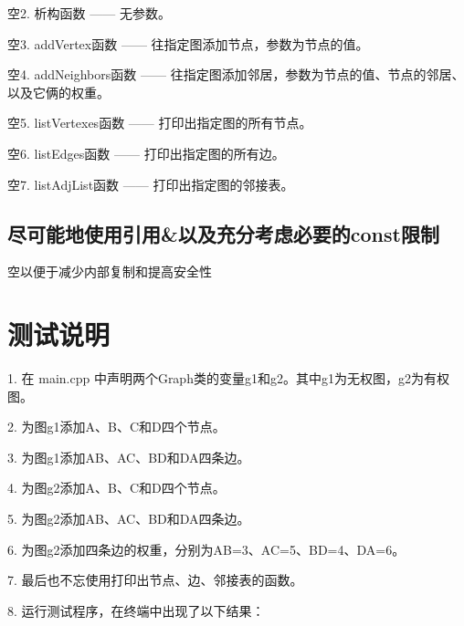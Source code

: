 \documentclass[UTF8]{ctexart}
\begin{document}
\hphantom 空2. 析构函数 —— 无参数。\newline

\hphantom 空3. addVertex函数 —— 往指定图添加节点，参数为节点的值。\newline

\hphantom 空4. addNeighbors函数 —— 往指定图添加邻居，参数为节点的值、节点的邻居、以及它俩的权重。\newline

\hphantom 空5. listVertexes函数 —— 打印出指定图的所有节点。\newline

\hphantom 空6. listEdges函数 —— 打印出指定图的所有边。\newline

\hphantom 空7. listAdjList函数 —— 打印出指定图的邻接表。

\subsection{尽可能地使用引用\&以及充分考虑必要的const限制}
\hphantom 空以便于减少内部复制和提高安全性

\section{测试说明}

1. 在 main.cpp 中声明两个Graph类的变量g1和g2。其中g1为无权图，g2为有权图。\newline

2. 为图g1添加A、B、C和D四个节点。 \newline

3. 为图g1添加AB、AC、BD和DA四条边。\newline

4. 为图g2添加A、B、C和D四个节点。 \newline

5. 为图g2添加AB、AC、BD和DA四条边。\newline

6. 为图g2添加四条边的权重，分别为AB=3、AC=5、BD=4、DA=6。\newline

7. 最后也不忘使用打印出节点、边、邻接表的函数。\newline

8. 运行测试程序，在终端中出现了以下结果：\newline
\end{document}
